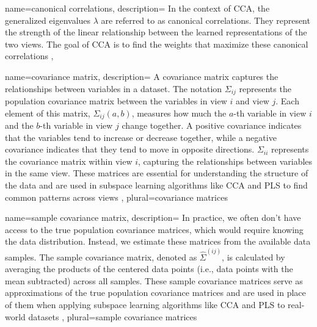  {
name={canonical correlations},
description={
In the context of CCA, the generalized eigenvalues $\lambda$ are referred to as canonical correlations. They represent the strength of the linear relationship between the learned representations of the two views. The goal of CCA is to find the weights that maximize these canonical correlations
},
}

 {
name={covariance matrix},
description={
A covariance matrix captures the relationships between variables in a dataset. The notation $\Sigma_{ij}$ represents the population covariance matrix between the variables in view $i$ and view $j$. Each element of this matrix, $\Sigma_{ij}(a,b)$, measures how much the $a$-th variable in view $i$ and the $b$-th variable in view $j$ change together. A positive covariance indicates that the variables tend to increase or decrease together, while a negative covariance indicates that they tend to move in opposite directions. $\Sigma_{ii}$ represents the covariance matrix within view $i$, capturing the relationships between variables in the same view. These matrices are essential for understanding the structure of the data and are used in subspace learning algorithms like CCA and PLS to find common patterns across views
},
plural={covariance matrices}
}

 {
name={sample covariance matrix},
description={
In practice, we often don't have access to the true population covariance matrices, which would require knowing the data distribution. Instead, we estimate these matrices from the available data samples. The sample covariance matrix, denoted as $\hat{\Sigma}^{(ij)}$, is calculated by averaging the products of the centered data points (i.e., data points with the mean subtracted) across all samples. These sample covariance matrices serve as approximations of the true population covariance matrices and are used in place of them when applying subspace learning algorithms like CCA and PLS to real-world datasets
},
plural={sample covariance matrices}
}

